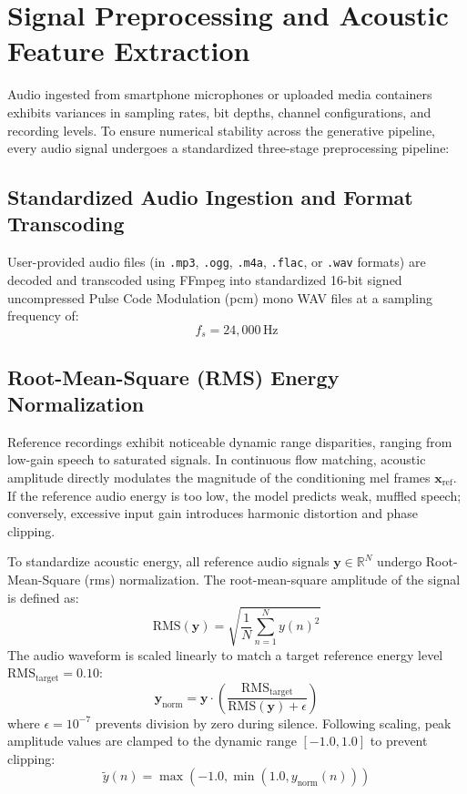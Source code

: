 \section{Signal Preprocessing and Acoustic Feature Extraction}
Audio ingested from smartphone microphones or uploaded media containers exhibits variances in sampling rates, bit depths, channel configurations, and recording levels. To ensure numerical stability across the generative pipeline, every audio signal undergoes a standardized three-stage preprocessing pipeline:

\subsection{Standardized Audio Ingestion and Format Transcoding}
User-provided audio files (in \texttt{.mp3}, \texttt{.ogg}, \texttt{.m4a}, \texttt{.flac}, or \texttt{.wav} formats) are decoded and transcoded using FFmpeg into standardized 16-bit signed uncompressed Pulse Code Modulation (\acrshort{pcm}) mono WAV files at a sampling frequency of:
\begin{equation}
    f_s = 24,000\,\text{Hz}
    \label{eq:sampling_frequency}
\end{equation}

\subsection{Root-Mean-Square (RMS) Energy Normalization}
Reference recordings exhibit noticeable dynamic range disparities, ranging from low-gain speech to saturated signals. In continuous flow matching, acoustic amplitude directly modulates the magnitude of the conditioning mel frames $\mathbf{x}_{\text{ref}}$. If the reference audio energy is too low, the model predicts weak, muffled speech; conversely, excessive input gain introduces harmonic distortion and phase clipping.

To standardize acoustic energy, all reference audio signals $\mathbf{y} \in \mathbb{R}^{N}$ undergo Root-Mean-Square (\acrshort{rms}) normalization. The root-mean-square amplitude of the signal is defined as:
\begin{equation}
    \text{RMS}(\mathbf{y}) = \sqrt{\frac{1}{N} \sum_{n=1}^N y(n)^2}
    \label{eq:rms_definition}
\end{equation}
The audio waveform is scaled linearly to match a target reference energy level $\text{RMS}_{\text{target}} = 0.10$:
\begin{equation}
    \mathbf{y}_{\text{norm}} = \mathbf{y} \cdot \left( \frac{\text{RMS}_{\text{target}}}{\text{RMS}(\mathbf{y}) + \epsilon} \right)
    \label{eq:rms_scaling}
\end{equation}
where $\epsilon = 10^{-7}$ prevents division by zero during silence. Following scaling, peak amplitude values are clamped to the dynamic range $[-1.0, 1.0]$ to prevent clipping:
\begin{equation}
    \tilde{y}(n) = \max\left( -1.0, \min\left( 1.0, y_{\text{norm}}(n) \right) \right)
    \label{eq:clamping}
\end{equation}

